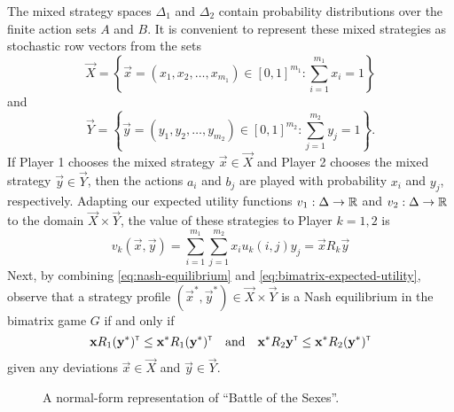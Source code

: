     The mixed strategy spaces $\Delta_1$ and $\Delta_2$ contain probability distributions over the finite action sets $A$ and $B$.
    It is convenient to represent these mixed strategies as stochastic row vectors from the sets
    \[
        \vec{X}
            =
            \left\{
                \vec{x}
                    = (x_1, x_2, \ldots, x_{m_1}) \in [0, 1]^{m_1}
                    : \sum_{i = 1}^{m_1} x_i = 1
            \right\}
    \]
    and
    \[
        \vec{Y}
            =
            \left\{
                \vec{y}
                    = (y_1, y_2, \ldots, y_{m_2}) \in [0, 1]^{m_2}
                    : \sum_{j = 1}^{m_2} y_j = 1
            \right\}.
    \]
    If Player 1 chooses the mixed strategy $\vec{x} \in \vec{X}$ and Player 2 chooses the mixed strategy $\vec{y} \in \vec{Y}$, then the actions $a_i$ and $b_j$ are played with probability $x_i$ and $y_j$, respectively.
    Adapting our expected utility functions $v_1 : \Delta \to \mathbb{R}$ and $v_2 : \Delta \to \mathbb{R}$ to the domain $\vec{X} \times \vec{Y}$, the value of these strategies to Player $k = 1, 2$ is
    \begin{equation} \label{eq:bimatrix-expected-utility}
        v_k(\vec{x}, \vec{y})
            = \sum_{i = 1}^{m_1} \sum_{j = 1}^{m_2} x_i u_k(i, j) y_j
            = \vec{x} R_k \vec{y}
    \end{equation}
    Next, by combining \eqref{eq:nash-equilibrium} and \eqref{eq:bimatrix-expected-utility}, observe that a strategy profile $(\vec{x}^*, \vec{y}^*) \in \vec{X} \times \vec{Y}$ is a Nash equilibrium in the bimatrix game $G$ if and only if
    \begin{equation} \label{eq:bimatrix-nash-equilibrium}
        \mathbf{x} R_1 (\mathbf{y}^*)^{\scriptscriptstyle \mathsf{T}}
            \le \mathbf{x}^* R_1 (\mathbf{y}^*)^{\scriptscriptstyle \mathsf{T}}
        \quad\text{and}\quad
        \mathbf{x}^* R_2 \mathbf{y}^{\scriptscriptstyle \mathsf{T}}
            \le \mathbf{x}^* R_2 (\mathbf{y}^*)^{\scriptscriptstyle \mathsf{T}}
    \end{equation}
    given any deviations $\vec{x} \in \vec{X}$ and $\vec{y} \in \vec{Y}$.

    \begin{figure}[t]
        \centering
        
        \caption[``Battle of the Sexes'' in Normal-Form]{A normal-form representation of ``Battle of the Sexes''.}
        \label{fig:battle-of-the-sexes}
    \end{figure}

